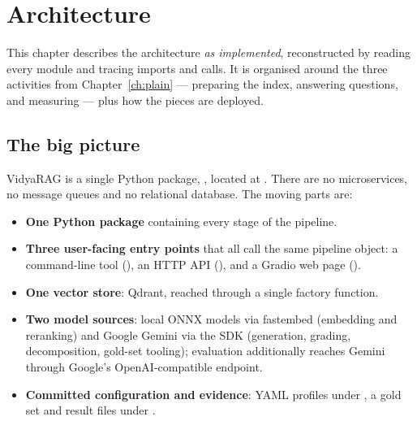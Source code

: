 \chapter{Architecture}
\label{ch:architecture}

This chapter describes the architecture \emph{as implemented}, reconstructed by reading every module and tracing imports and calls. It is organised around the three activities from Chapter~\ref{ch:plain} --- preparing the index, answering questions, and measuring --- plus how the pieces are deployed.

\section{The big picture}

VidyaRAG is a single Python package, , located at . There are no microservices, no message queues and no relational database. The moving parts are:

\begin{itemize}
  \item \textbf{One Python package} containing every stage of the pipeline.
  \item \textbf{Three user-facing entry points} that all call the same pipeline object: a command-line tool (), an HTTP API (), and a Gradio web page ().
  \item \textbf{One vector store}: Qdrant, reached through a single factory function.
  \item \textbf{Two model sources}: local ONNX models via fastembed (embedding and reranking) and Google Gemini via the  SDK (generation, grading, decomposition, gold-set tooling); evaluation additionally reaches Gemini through Google's OpenAI-compatible endpoint.
  \item \textbf{Committed configuration and evidence}: YAML profiles under , a gold set and result files under .
\end{itemize}

